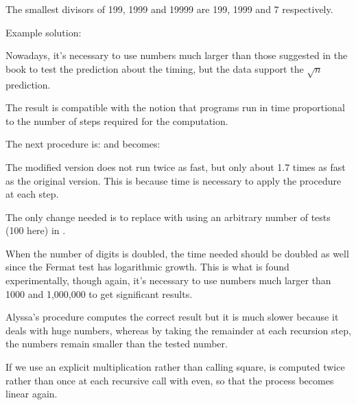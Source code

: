 \begin{exe}[1.21]
    The smallest divisors of 199, 1999 and 19999 are 199, 1999 and 
    7 respectively.
\end{exe}

\begin{exe}[1.22]
    Example solution:

    Nowadays, it’s necessary to use numbers much larger than those suggested in 
    the book to test the prediction about the timing, but the data support the 
    $\sqrt{n}$ prediction.

    The result is compatible with the notion that programs run in time 
    proportional to the number of steps required for the computation.
\end{exe}

\begin{exe}[1.23]
    The next procedure is:
    and  becomes:

    The modified version does not run twice as fast, but only about 1.7 times 
    as fast as the original version. This is because time is necessary to 
    apply the  procedure at each step.
\end{exe}

\begin{exe}[1.24]
    The only change needed is to replace  with  
    using an arbitrary number of tests (100 here) in .

    When the number of digits is doubled, the time needed should be doubled as 
    well since the Fermat test has logarithmic growth. This is what is found 
    experimentally, though again, it’s necessary to use numbers much larger 
    than 1000 and 1,000,000 to get significant results.
\end{exe}

\begin{exe}[1.25]
    Alyssa’s procedure computes the correct result but it is much slower 
    because it deals with huge numbers, whereas by taking the remainder at 
    each recursion step, the numbers remain smaller than the tested number.
\end{exe}

\begin{exe}[1.26]
    If we use an explicit multiplication rather than calling square, 
     is computed twice rather than once at 
    each recursive call with  even, so that the process becomes 
    linear again.
\end{exe}

